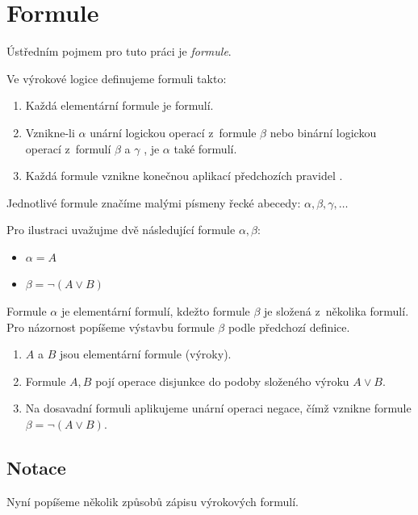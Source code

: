 \documentclass[thesis=B,czech,hidelinks]{thesis}[2012/06/26]
\begin{document}
\section{Formule}

Ústředním pojmem pro tuto práci je \emph{formule}.

\begin{dfn}
\label{dfn:formula}
Ve výrokové logice definujeme formuli takto:

\begin{enumerate}
	\item Každá elementární formule je formulí.
	\item Vznikne-li $\alpha$ unární logickou operací z~formule $\beta$ nebo binární logickou operací z~formulí $\beta$ a $\gamma$ , je $\alpha$ také formulí.
	\item Každá formule vznikne konečnou aplikací předchozích pravidel \cite{sochor}.
\end{enumerate}
\end{dfn}

Jednotlivé formule značíme malými písmeny řecké abecedy: $\alpha , \beta , \gamma , \ldots$

\begin{exm}
	Pro ilustraci uvažujme dvě následující formule $\alpha, \beta$:
	\begin{itemize}
		\item $\alpha = A$
		\item $\beta = \neg (A \vee B)$
	\end{itemize}
	Formule $\alpha$ je elementární formulí, kdežto formule $\beta$ je složená z~několika formulí. Pro názornost popíšeme výstavbu formule $\beta$ podle předchozí definice.
	\begin{enumerate}
		\item $A$ a $B$ jsou elementární formule (výroky).
		\item Formule $A, B$ pojí operace disjunkce do podoby složeného výroku $A \vee B$.
		\item Na dosavadní formuli aplikujeme unární operaci negace, čímž vznikne formule $\beta = \neg (A \vee B)$.
	\end{enumerate}
\end{exm}

\subsection{Notace}

Nyní popíšeme několik způsobů zápisu výrokových formulí.
\end{document}
